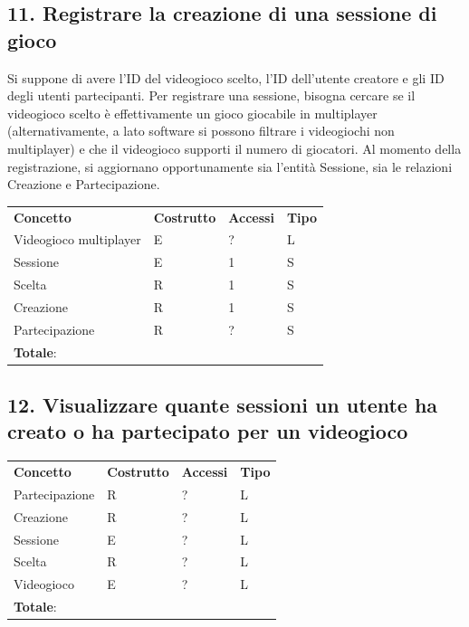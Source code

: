 \documentclass[a4paper,12pt]{report}
\begin{document}
\newpage

\subsection*{11. Registrare la creazione di una sessione di gioco}

Si suppone di avere l'ID del videogioco scelto, l'ID dell'utente creatore e gli ID degli utenti partecipanti. Per registrare una sessione, bisogna cercare se il videogioco scelto è effettivamente un gioco giocabile in multiplayer (alternativamente, a lato software si possono filtrare i videogiochi non multiplayer) e che il videogioco supporti il numero di giocatori. Al momento della registrazione, si aggiornano opportunamente sia l'entità Sessione, sia le relazioni Creazione e Partecipazione.

\begin{table}[h!]
\begin{center}
	\begin{tabular}{ | m{4cm} P{4cm} P{4cm} P{4cm} | }
	 \textbf{Concetto} & \textbf{Costrutto} & \textbf{Accessi} & \textbf{Tipo} \\
	Videogioco multiplayer  	& E & ? & L \\ \hline
	Sessione					& E & 1 & S \\ \hline
	Scelta					& R & 1 & S \\ \hline
	Creazione				& R & 1 & S \\ \hline
	Partecipazione			& R & ? & S \\ \hline 
	 \textbf{Totale}: & & & \\ \hline
	\end{tabular}
\end{center}
\end{table}

\subsection*{12. Visualizzare quante sessioni un utente ha creato o ha partecipato per un videogioco}

\begin{table}[h!]
\begin{center}
	\begin{tabular}{ | m{4cm} P{4cm} P{4cm} P{4cm} | }
	 \textbf{Concetto} & \textbf{Costrutto} & \textbf{Accessi} & \textbf{Tipo} \\
	Partecipazione & R & ? & L \\ \hline
	Creazione      & R & ? & L \\ \hline
	Sessione       & E & ? & L \\ \hline
	Scelta		   & R & ? & L \\ \hline
	Videogioco     & E & ? & L \\ \hline
	 \textbf{Totale}: & & & \\ \hline
	\end{tabular}
\end{center}
\end{table}
\end{document}

